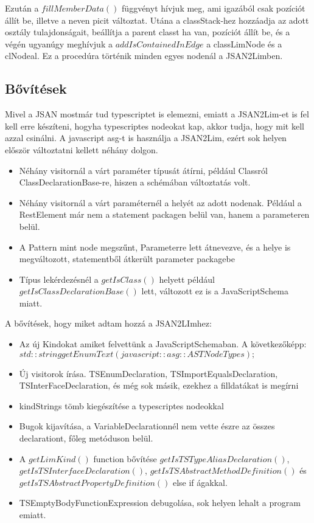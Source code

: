 \noindent

Ezután a $fillMemberData()$ függvényt hívjuk meg, ami igazából csak pozíciót állít be, illetve a neven picit változtat.
Utána a classStack-hez hozzáadja az adott osztály tulajdonságait, beállítja a parent classt ha van, pozíciót állít be, és a végén ugyanúgy meghívjuk a $addIsContainedInEdge$ a classLimNode és a clNodeal.
Ez a procedúra történik minden egyes nodenál a JSAN2Limben.

\subsection{Bővítések}

\noindent

Mivel a JSAN mostmár tud typescriptet is elemezni, emiatt a JSAN2Lim-et is fel kell erre készíteni, hogyha typescriptes nodeokat kap, akkor tudja, hogy mit kell azzal csinálni.
A javascript asg-t is használja a JSAN2Lim, ezért sok helyen először változtatni kellett néhány dolgon.
\begin{itemize}
      \item Néhány visitornál a várt paraméter típusát átírni, például Classról ClassDeclarationBase-re, hiszen a schémában változtatás volt.
      \item Néhány visitornál a várt paraméternél a helyét az adott nodenak. Például a RestElement már nem a statement packagen belül van, hanem a parameteren belül.
      \item A Pattern mint node megszűnt, Parameterre lett átnevezve, és a helye is megváltozott, statementből átkerült parameter packagebe
      \item Típus lekérdezésnél a $getIsClass()$ helyett például $getIsClassDeclarationBase()$ lett, változott ez is a JavaScriptSchema miatt.
\end{itemize}

A bővítések, hogy miket adtam hozzá a JSAN2LImhez:
\begin{itemize}
      \item Az új Kindokat amiket felvettünk a JavaScriptSchemaban. A következőképp: $std::string getEnumText(javascript::asg::ASTNodeTypes);$
      \item Új visitorok írása. TSEnumDeclaration, TSImportEqualsDeclaration, TSInterFaceDeclaration, és még sok másik, ezekhez a filldatákat is megírni
      \item kindStrings tömb kiegészítése a typescriptes nodeokkal
      \item Bugok kijavítása, a VariableDeclarationnél nem vette észre az összes declarationt, főleg metóduson belül.
      \item A $getLimKind()$ function bővítése $getIsTSTypeAliasDeclaration()$, $getIsTSInterfaceDeclaration()$, $getIsTSAbstractMethodDefinition()$ és $getIsTSAbstractPropertyDefinition()$ else if ágakkal.
      \item TSEmptyBodyFunctionExpression debugolása, sok helyen lehalt a program emiatt.
\end{itemize}


